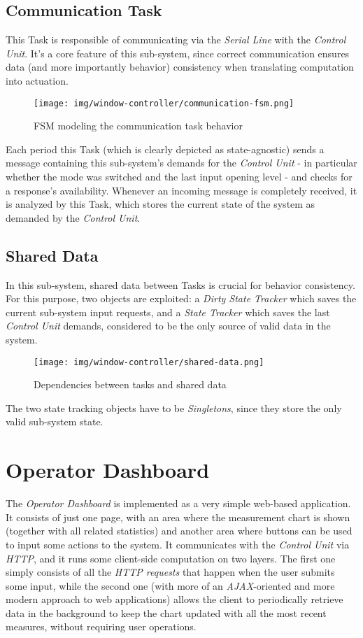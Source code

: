 \documentclass[a4paper,12pt]{report}
\begin{document}
		\subsection{Communication Task}
		This Task is responsible of communicating via the \textit{Serial Line} with the \textit{Control Unit}. It's a core feature of this sub-system, since correct communication ensures data (and more importantly behavior) consistency when translating computation into actuation.
		\begin{figure}[H]
			\centering{}
			\texttt{[image: img/window-controller/communication-fsm.png]}
			\caption{FSM modeling the communication task behavior}
			\label{img:window-controller/communication-fsm}
		\end{figure}
		Each period this Task (which is clearly depicted as state-agnostic) sends a message containing this sub-system's demands for the \textit{Control Unit} - in particular whether the mode was switched and the last input opening level - and checks for a response's availability. Whenever an incoming message is completely received, it is analyzed by this Task, which stores the current state of the system as demanded by the \textit{Control Unit}.
		\subsection{Shared Data}
		In this sub-system, shared data between Tasks is crucial for behavior consistency. For this purpose, two objects are exploited: a \textit{Dirty State Tracker} which saves the current sub-system input requests, and a \textit{State Tracker} which saves the last \textit{Control Unit} demands, considered to be the only source of valid data in the system.
		\begin{figure}[H]
			\centering{}
			\texttt{[image: img/window-controller/shared-data.png]}
			\caption{Dependencies between tasks and shared data}
			\label{img:window-controller/shared-data}
		\end{figure}
		The two state tracking objects have to be \textit{Singletons}, since they store the only valid sub-system state.
	\section{Operator Dashboard}
	The \textit{Operator Dashboard} is implemented as a very simple web-based application. It consists of just one page, with an area where the measurement chart is shown (together with all related statistics) and another area where buttons can be used to input some actions to the system.
	\newline It communicates with the \textit{Control Unit} via \textit{HTTP}, and it runs some client-side computation on two layers. The first one simply consists of all the \textit{HTTP requests} that happen when the user submits some input, while the second one (with more of an \textit{AJAX}-oriented and more modern approach to web applications) allows the client to periodically retrieve data in the background to keep the chart updated with all the most recent measures, without requiring user operations.
\end{document}

